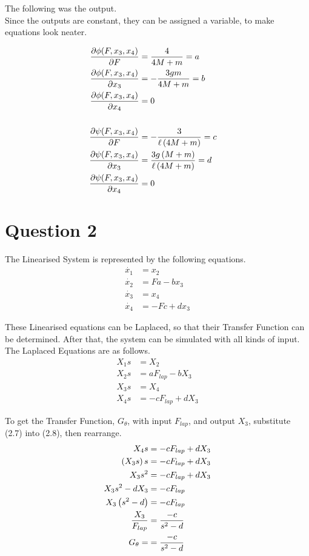 \documentclass[a4paper,10pt,reqno]{article}
\numberwithin{equation}{section}
\begin{document}
\newpage
\noindent
The following was the output.\\
Since the outputs are constant, they can be assigned a variable, to make equations look neater.

\begin{align}
\frac{\partial \phi(F, x_3, x_4)}{\partial F} &= \frac{4}{4 M + m} = a\cr
\frac{\partial \phi(F, x_3, x_4)}{\partial x_{3}} &= - \frac{3 g m}{4 M + m} = b\cr
\frac{\partial \phi(F, x_3, x_4)}{\partial x_{4}} &= 0\cr
\\
\frac{\partial \psi(F, x_3, x_4)}{\partial F} &= - \frac{3}{\ell \left(4 M + m\right)} = c\cr
\frac{\partial \psi(F, x_3, x_4)}{\partial x_{3}} &= \frac{3 g \left(M + m\right)}{\ell \left(4 M + m\right)} = d\cr
\frac{\partial \psi(F, x_3, x_4)}{\partial x_{4}} &= 0\cr
\end{align}


\section{Question 2}
The Linearised System is represented by the following equations.
\begin{align}
\dot{x_1} &= x_{2}\\
\dot{x_2} &= F a - b x_{3}\\
\dot{x_3} &= x_{4}\\
\dot{x_4} &= - F c + d x_{3}
\end{align}

\noindent
These Linearised equations can be Laplaced, so that their Transfer Function can be determined. After that, the system can be simulated with all kinds of input.\\
The Laplaced Equations are as follows.
\begin{align}
X_{1} s &= X_{2}\\
X_{2} s &= a F_{lap} - b X_{3}\\
X_{3} s &= X_{4}\\
X_{4} s &= -c F_{lap} + d X_{3}
\end{align}

\noindent
To get the Transfer Function, $G_{\theta}$, with input $F_{lap}$, and output $X_3$, substitute (2.7) into (2.8), then rearrange.
\begin{align}
X_{4} s &= -c F_{lap} + d X_{3}\cr
\left( X_{3} s \right) s &= -c F_{lap} + d X_{3}\cr
X_{3}  s^2 &= -c F_{lap} + d X_{3}\cr
X_{3}  s^2 - d X_{3} &= -c F_{lap}\cr
X_{3} \left( s^2 - d \right) &= -c F_{lap}\cr
\frac{X_{3}}{F_{lap}} &= \frac{-c}{s^2 - d}\\
G_{\theta} = &= \frac{-c}{s^2 - d}
\end{align}
\end{document}
